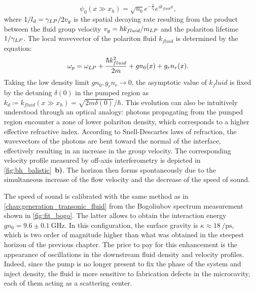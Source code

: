 \begin{equation}
    \psi_0(x \gg x_h) = \sqrt{n_0}e^{-\frac{x}{l_d}}e^{i k_{fluid}x},
\end{equation}
where $1/l_d=\gamma_{LP}/2v_g$ is the spatial decaying rate resulting from the product between the fluid group velocity $v_g =\hbar k_{fluid}/m_{LP} $ and the polariton lifetime $1/\gamma_{LP}$. The local wavevector of the polariton fluid $k_{fluid}$ is determined by the equation: 
\begin{equation} 
    \omega_p = \omega_{LP} + \frac{\hbar k_{fluid}^2}{2m} + gn_0(x) + g_r n_r(x).
    \label{eq:bernoulli}
\end{equation}
Taking the low density limit $gn_0, g_rn_r \to 0$, the asymptotic value of $k_fluid$ is fixed by the detuning $\delta(0)$ in the pumped region as $k_d \coloneqq k_{fluid}(x \gg x_h) = \sqrt{2m\delta(0)}/\hbar$.
This evolution can also be intuitively understood through an optical analogy: photons propagating from the pumped region encounter a zone of lower polariton density, which corresponds to a higher effective refractive index. According to Snell-Descartes laws of refraction, the wavevectors of the photons are bent toward the normal of the interface, effectively resulting in an increase in the group velocity. 
The corresponding velocity profile measured by off-axis interferometry is depicted in \autoref{fig:bh_balistic}~\textbf{b)}.  The horizon then forms
spontaneously due to the simultaneous increase of the flow velocity and the decrease of the speed of sound.

\bigskip


The speed of sound is calibrated with the same method as in \autoref{chap:generation_transonic_fluid} from the Bogoliubov spectrum measurement shown in \autoref{fig:fit_bogo}. The latter allows to obtain the interaction energy $gn_0 =9.6 \pm \SI{0.1}{\giga \hertz}$.
In this configuration, the surface gravity is $\kappa\approx \SI{18}{\per \pico \second}$, which is two order of magnitude higher than what was obtained 
in the steepest horizon of the previous chapter. The price to pay for this enhancement is the appearance of oscillations in the downstream fluid density and velocity profiles.
Indeed, since the pump is no longer present to fix the phase of the system and inject density, the fluid is more sensitive to fabrication defects in the microcavity, each of them
acting as a scattering center.



